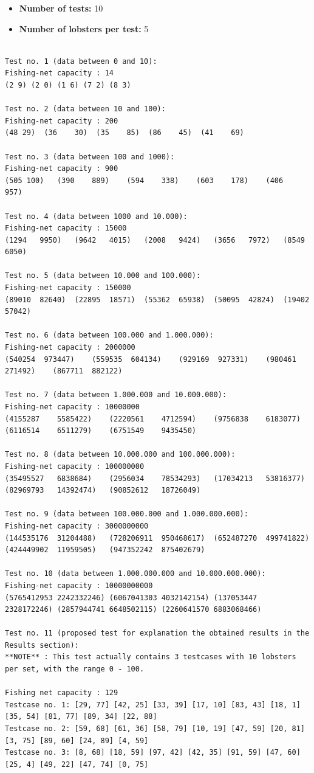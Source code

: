 \documentclass{article}%
\begin{document}
\begin{itemize}
    \item \textbf{Number of tests:} 10
    \item \textbf{Number of lobsters per test:} 5
\end{itemize}

\small
\begin{verbatim}

Test no. 1 (data between 0 and 10):
Fishing-net capacity : 14						
(2 9) (2 0) (1 6) (7 2) (8 3)

Test no. 2 (data between 10 and 100):
Fishing-net capacity : 200						
(48 29)	 (36	30)	 (35	85)	 (86	45)	 (41	69)

Test no. 3 (data between 100 and 1000):
Fishing-net capacity : 900						
(505 100)	(390	889) 	(594	338)	(603	178)	(406	957)

Test no. 4 (data between 1000 and 10.000):
Fishing-net capacity : 15000						
(1294	9950)	(9642	4015)	(2008	9424)	(3656	7972)	(8549	6050)

Test no. 5 (data between 10.000 and 100.000):
Fishing-net capacity : 150000						
(89010	82640)	(22895	18571)	(55362	65938)	(50095	42824)	(19402	57042)

Test no. 6 (data between 100.000 and 1.000.000):
Fishing-net capacity : 2000000						
(540254	 973447)	(559535	 604134)	(929169	 927331)	(980461	 271492)	(867711	 882122)

Test no. 7 (data between 1.000.000 and 10.000.000):
Fishing-net capacity : 10000000						
(4155287	5585422)	(2220561	4712594)	(9756838	6183077)	(6116514	6511279)	(6751549	9435450)

Test no. 8 (data between 10.000.000 and 100.000.000):
Fishing-net capacity : 100000000						
(35495527	6838684)	(2956034	78534293)	(17034213	53816377)	(82969793	14392474)	(90852612	18726049)

Test no. 9 (data between 100.000.000 and 1.000.000.000):
Fishing-net capacity : 3000000000						
(144535176	31204488)	(728206911	950468617)	(652487270	499741822)	(424449902	11959505)	(947352242	875402679)

Test no. 10 (data between 1.000.000.000 and 10.000.000.000):
Fishing-net capacity : 10000000000						
(5765412953	2242332246)	(6067041303	4032142154)	(137053447	2328172246)	(2857944741	6648502115)	(2260641570	6883068466)     

Test no. 11 (proposed test for explanation the obtained results in the Results section):  
**NOTE** : This test actually contains 3 testcases with 10 lobsters per set, with the range 0 - 100.                        

Fishing net capacity : 129
Testcase no. 1: [29, 77] [42, 25] [33, 39] [17, 10] [83, 43] [18, 1] [35, 54] [81, 77] [89, 34] [22, 88] 
Testcase no. 2: [59, 68] [61, 36] [58, 79] [10, 19] [47, 59] [20, 81] [3, 75] [89, 60] [24, 89] [4, 59] 
Testcase no. 3: [8, 68] [18, 59] [97, 42] [42, 35] [91, 59] [47, 60] [25, 4] [49, 22] [47, 74] [0, 75]
                                         

\end{verbatim}
                        \vspace*{\fill}                   
\newpage%
\end{document}
